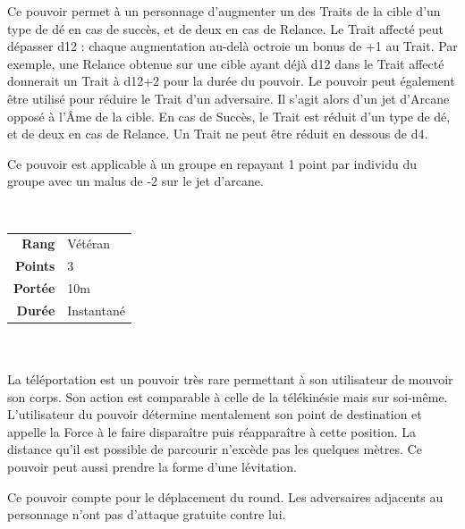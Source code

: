 \begin{description}[align=left]
        Ce pouvoir permet à un personnage d’augmenter un des Traits de la cible d’un type de dé en cas de succès, et de deux en cas de Relance. Le Trait affecté peut dépasser d12 : chaque augmentation au-delà octroie un bonus de +1 au Trait. 
        Par exemple, une Relance obtenue sur une cible ayant déjà d12 dans le Trait affecté donnerait un Trait à d12+2 pour la durée du pouvoir. 
        Le pouvoir peut également être utilisé pour réduire le Trait d’un adversaire. Il s’agit alors d’un jet d’Arcane opposé à l’Âme de la cible. En cas de Succès, le Trait est réduit d’un type de dé, et de deux en cas de Relance. Un Trait ne peut être réduit en dessous de d4.

        Ce pouvoir est applicable à un groupe en repayant 1 point par individu du groupe avec un malus de -2 sur le jet d'arcane.
        \\

    \item [Téléportation] ~ \\

        \begin{tabular}{ r l }
            \textbf{Rang}    & Vétéran \\
            \textbf{Points}  & 3 \\
            \textbf{Portée}  & 10m \\
            \textbf{Durée}   & Instantané \\
        \end{tabular}
        \\ \\
        La téléportation est un pouvoir très rare permettant à son utilisateur de mouvoir son corps. Son action est comparable à celle de la télékinésie mais sur soi-même. L'utilisateur du pouvoir détermine mentalement son point de destination et appelle la Force à le faire disparaître puis réapparaître à cette position. La distance qu'il est possible de parcourir n'excède pas les quelques mètres. Ce pouvoir peut aussi prendre la forme d'une lévitation.

        Ce pouvoir compte pour le déplacement du round. Les adversaires adjacents au personnage n’ont pas d’attaque gratuite contre lui.
        \\

\end{description}